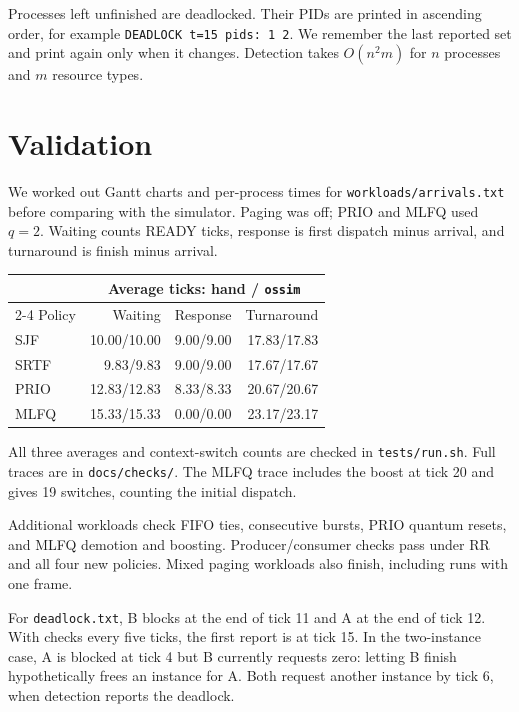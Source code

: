 \documentclass[11pt,a4paper,twocolumn]{article}
\newcommand{\code}[1]{\texttt{#1}}
\begin{document}
Processes left unfinished are deadlocked. Their PIDs are printed in
ascending order, for example \code{DEADLOCK t=15 pids: 1 2}. We remember
the last reported set and print again only when it changes. Detection
takes \(O(n^2m)\) for \(n\) processes and \(m\) resource types.

\section{Validation}

We worked out Gantt charts and per-process times for
\code{workloads/arrivals.txt} before comparing with the simulator.
Paging was off; PRIO and MLFQ used \(q=2\). Waiting counts READY ticks,
response is first dispatch minus arrival, and turnaround is finish
minus arrival.

\begin{center}
{\footnotesize
\setlength{\tabcolsep}{3pt}
\begin{tabular}{@{}lrrr@{}}
\toprule
 & \multicolumn{3}{c}{Average ticks: hand / \code{ossim}} \\
\cmidrule(l){2-4}
Policy & Waiting & Response & Turnaround \\
\midrule
SJF  & 10.00/10.00 & 9.00/9.00 & 17.83/17.83 \\
SRTF & 9.83/9.83   & 9.00/9.00 & 17.67/17.67 \\
PRIO & 12.83/12.83 & 8.33/8.33 & 20.67/20.67 \\
MLFQ & 15.33/15.33 & 0.00/0.00 & 23.17/23.17 \\
\bottomrule
\end{tabular}}
\end{center}

All three averages and context-switch counts are checked in
\code{tests/run.sh}. Full traces are in \code{docs/checks/}.
The MLFQ trace includes the boost at tick 20 and gives 19 switches,
counting the initial dispatch.

Additional workloads check FIFO ties, consecutive bursts, PRIO quantum
resets, and MLFQ demotion and boosting. Producer/consumer checks pass
under RR and all four new policies. Mixed paging workloads also finish,
including runs with one frame.

For \code{deadlock.txt}, B blocks at the end of tick 11 and A at the end
of tick 12. With checks every five ticks, the first report is at tick 15.
In the two-instance case, A is blocked at tick 4 but B currently requests
zero: letting B finish hypothetically frees an instance for A. Both
request another instance by tick 6, when detection reports the deadlock.
\end{document}
